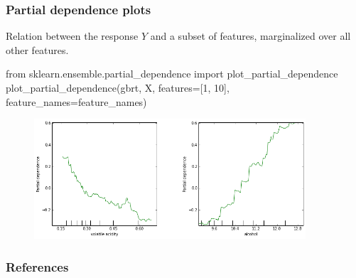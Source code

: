 \documentclass{beamer}
\begin{document}
\begin{frame}[fragile]
  \frametitle{Partial dependence plots}

Relation between the response $Y$ and a subset of features, marginalized over all other features.

\vspace{0.25cm}

{\scriptsize
\begin{pythoncode}
from sklearn.ensemble.partial_dependence import plot_partial_dependence
plot_partial_dependence(gbrt, X,
                        features=[1, 10], feature_names=feature_names)
\end{pythoncode}
}

    \begin{figure}
       \centering
       \includegraphics[width=0.9\textwidth]{./figures/dependence.png}
    \end{figure}
\end{frame}








\begin{frame}
    \frametitle{References}
    {\footnotesize
    
    }
\end{frame}
\end{document}
